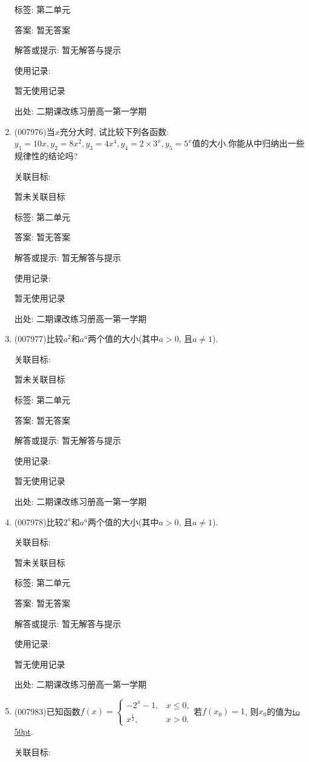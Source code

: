 \documentclass[10pt,a4paper]{article}
\newcommand{\blank}[1]{\underline{\hbox to #1pt{}}}
\begin{document}
\begin{enumerate}[1.]
标签: 第二单元

答案: 暂无答案

解答或提示: 暂无解答与提示

使用记录:

暂无使用记录


出处: 二期课改练习册高一第一学期
\item { (007976)}当$x$充分大时, 试比较下列各函数: $y_1=10x,y_2=8x^2,y_3=4x^4,y_4=2\times 3^x,y_5=5^x$值的大小.你能从中归纳出一些规律性的结论吗?


关联目标:

暂未关联目标



标签: 第二单元

答案: 暂无答案

解答或提示: 暂无解答与提示

使用记录:

暂无使用记录


出处: 二期课改练习册高一第一学期
\item { (007977)}比较$a^2$和$a^a$两个值的大小(其中$a>0$, 且$a\ne 1$).


关联目标:

暂未关联目标



标签: 第二单元

答案: 暂无答案

解答或提示: 暂无解答与提示

使用记录:

暂无使用记录


出处: 二期课改练习册高一第一学期
\item { (007978)}比较$2^a$和$a^a$两个值的大小(其中$a>0$, 且$a\ne 1$).


关联目标:

暂未关联目标



标签: 第二单元

答案: 暂无答案

解答或提示: 暂无解答与提示

使用记录:

暂无使用记录


出处: 二期课改练习册高一第一学期
\item { (007983)}已知函数$f(x)=\begin{cases} -2^x-1, & x\le 0, \\x^{\frac 12}, & x>0. \end{cases}$若$f(x_0)=1$, 则$x_0$的值为\blank{50}.


关联目标:


\end{enumerate}
\end{document}

